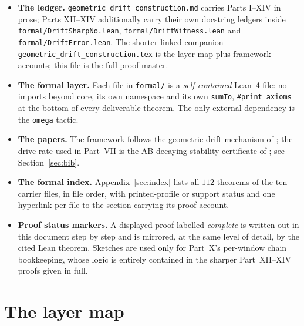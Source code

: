 \documentclass[11pt]{article}
\theoremstyle{plain}
\theoremstyle{definition}
\begin{document}
\begin{itemize}
\item \textbf{The ledger.} \texttt{geometric\_drift\_construction.md} carries Parts I--XIV in
prose; Parts XII--XIV additionally carry their own docstring ledgers inside
\texttt{formal/DriftSharpNo.lean}, \texttt{formal/DriftWitness.lean} and
\texttt{formal/DriftError.lean}. The shorter linked companion
\texttt{geometric\_drift\_construction.tex} is the layer map plus framework accounts;
this file is the full-proof master.
\item \textbf{The formal layer.} Each file in \texttt{formal/} is a \emph{self-contained}
Lean~4 file: no imports beyond core, its own namespace and its own \texttt{sumTo},
\texttt{\#print axioms} at the bottom of every deliverable theorem. The only external
dependency is the \texttt{omega} tactic.
\item \textbf{The papers.} The framework follows the geometric-drift mechanism of
\cite{dubois}; the drive rate used in Part~VII is the AB decaying-stability certificate of
\cite{blowup}; see Section~\ref{sec:bib}.
\item \textbf{The formal index.} Appendix~\ref{sec:index} lists all $112$ theorems of the
ten carrier files, in file order, with printed-profile or support status and one hyperlink per
file to the section carrying its proof account.
\item \textbf{Proof status markers.} A displayed proof labelled \emph{complete} is written
out in this document step by step and is mirrored, at the same level of detail, by the
cited Lean theorem. Sketches are used only for Part~X's per-window chain bookkeeping,
whose logic is entirely contained in the sharper Part~XII--XIV proofs given in full.
\end{itemize}

\section{The layer map}\label{sec:map}
\end{document}
